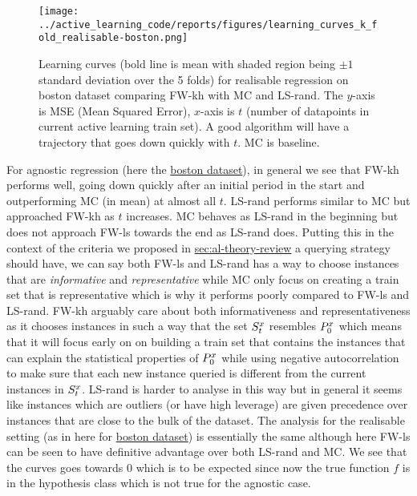\begin{figure}[ht] \centering
  \label{fig:learning-curve-boston-realisable-experiments}
  \texttt{[image: ../active\_learning\_code/reports/figures/learning\_curves\_k\_fold\_realisable-boston.png]}
  \caption{Learning curves (bold line is mean with shaded region being \(\pm 1\)
    standard deviation over the 5 folds) for realisable regression on boston dataset
    comparing FW-kh with MC and LS-rand. The \(y\)-axis is MSE (Mean Squared
    Error), \(x\)-axis is \(t\) (number of datapoints in current active learning
    train set). A good algorithm will have a trajectory that goes down quickly with
    \(t\). MC is baseline.}
\end{figure}


For agnostic regression (here the
\hyperref[fig:learning-curve-boston-agnostic-experiments]{boston dataset}), in
general we see that FW-kh performs well, going down quickly after an initial
period in the start and
outperforming MC (in mean) at almost all \(t\). LS-rand performs similar to MC
but approached FW-kh as \(t\) increases. MC behaves as LS-rand in the beginning
but does not approach FW-ls towards the end as LS-rand does. Putting this in the
context of the criteria we proposed in \hyperref[Active Learning Theory Review]{sec:al-theory-review} a querying strategy should have, we can say
 both FW-ls and LS-rand has a way to choose instances that are
\textit{informative} and \textit{representative} while MC only focus on creating
a train set that is representative which is why it performs poorly compared to
FW-ls and LS-rand. FW-kh arguably care about both informativeness and
representativeness as it chooses
instances in such a way that the set \(S^x_t\) resembles \(P^x_0\)
which means that it will focus early on on building a train set that contains the
instances that can explain the statistical properties of \(P^x_0\) while
using negative autocorrelation to make sure that each new instance queried is
different from the current instances in \(S^x_t\).
LS-rand is harder to analyse in this way but in general it seems like instances
which are outliers (or have high leverage) are given precedence over instances
that are close to the bulk of the dataset. The
analysis for the realisable setting (as in here for
\hyperref[fig:learning-curve-boston-realisable-experiments]{boston dataset}) is
essentially the same although here FW-ls can be seen to have definitive
advantage over both LS-rand and MC. We see that the curves goes towards 0 which is to
be expected since now the true function \(f\) is in the hypothesis class which is not
true for the agnostic case.


